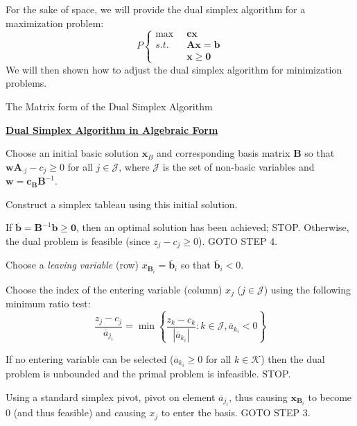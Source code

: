 For the sake of space, we will provide the dual simplex algorithm for a maximization problem:
\begin{displaymath}
P \left\{
\begin{aligned}
\max\;\;&\mathbf{c}\mathbf{x}\\
s.t.\;\;& \mathbf{A}\mathbf{x} = \mathbf{b}\\
&\mathbf{x} \geq \mathbf{0}
\end{aligned}\right.
\end{displaymath}
We will then shown how to adjust the dual simplex algorithm for minimization problems.


\begin{algorithm}
\caption{The Matrix form of the Dual Simplex Algorithm}
\label{alg:DualSimplexMatrixForm}
\begin{center}
\begin{minipage}[t]{\textwidth-1em}
\underline{\textbf{Dual Simplex Algorithm in Algebraic Form}}
\begin{enumerate*}
\item Choose an initial basic solution $\mathbf{x}_B$ and corresponding basis matrix $\mathbf{B}$ so that $\mathbf{w}\mathbf{A}_{\cdot j} - c_j \geq 0$ for all $j \in \mathcal{J}$, where $\mathcal{J}$ is the set of non-basic variables and $\mathbf{w} = \mathbf{c}_\mathbf{B}\mathbf{B}^{-1}$. 

\item Construct a simplex tableau using this initial solution.

\item If $\overline{\mathbf{b}} = \mathbf{B}^{-1}\mathbf{b} \geq \mathbf{0}$, then an optimal solution has been achieved; STOP. Otherwise, the dual problem is feasible (since $z_j - c_j \geq 0$). GOTO STEP 4.

\item Choose a \textit{leaving variable} (row) $x_{\mathbf{B}_i} = \overline{\mathbf{b}}_i$ so that $\overline{\mathbf{b}}_i < 0$.

\item Choose the index of the entering variable (column) $x_j$ ($j \in \mathcal{J}$) using the following minimum ratio test:
\begin{displaymath}
\frac{z_j - c_j}{\overline{a}_{j_i}} = \min\left\{\frac{z_k - c_k}{|\overline{a}_{k_i}|}  : k \in \mathcal{J}, \overline{a}_{k_i} < 0\right\}
\end{displaymath}

\item If no entering variable can be selected ($\overline{a}_{k_i} \geq 0$ for all $k \in \mathcal{K}$) then the dual problem is unbounded and the primal problem is infeasible. STOP.

\item Using a standard simplex pivot, pivot on element $\overline{a}_{j_i}$, thus causing $\mathbf{x}_{\mathbf{B}_i}$ to become $0$ (and thus feasible) and causing $x_j$ to enter the basis. GOTO STEP 3.
\end{enumerate*}
\end{minipage}
\end{center}
\end{algorithm}

